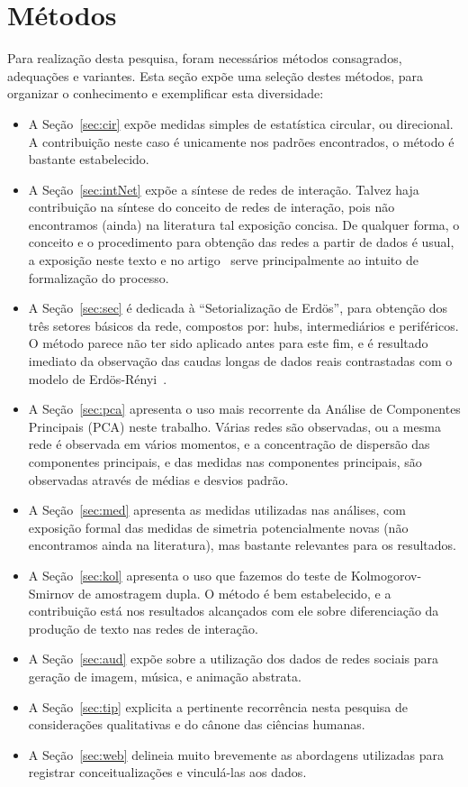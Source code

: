 \documentclass[a4paper,openright,12pt]{report} %
\begin{document}
\chapter{Métodos}\label{sec:met}
Para realização desta pesquisa, foram
necessários métodos consagrados, adequações
e variantes.
Esta seção expõe uma seleção destes métodos,
para organizar o conhecimento
e exemplificar esta diversidade:
\begin{itemize}
    \item A Seção~\ref{sec:cir} expõe medidas simples
de estatística circular, ou direcional.
A contribuição neste caso é unicamente nos
padrões encontrados, o método é bastante estabelecido.
    \item A Seção~\ref{sec:intNet} expõe a síntese de redes
        de interação. Talvez haja contribuição na síntese
        do conceito de redes de interação, pois não 
        encontramos (ainda) na literatura tal exposição
        concisa. De qualquer forma, o conceito e o procedimento
        para obtenção das redes a partir de dados é usual,
        a exposição neste texto e no artigo~\cite{timeS} serve
        principalmente ao intuito de formalização do
        processo.
    \item A Seção~\ref{sec:sec} é dedicada à ``Setorialização de Erdös'', para obtenção dos três setores básicos da rede, compostos por: hubs, intermediários e periféricos. 
        O método parece não ter sido aplicado antes para este fim, e é resultado imediato da observação das caudas longas de dados reais contrastadas com o modelo de Erdös-Rényi~\cite{3setores}.
    \item A Seção~\ref{sec:pca} apresenta o uso mais recorrente da Análise de Componentes Principais (PCA) neste trabalho. Várias redes são observadas, ou a mesma rede é observada em vários momentos, e a concentração
        de dispersão das componentes principais, e das medidas nas componentes principais, são observadas através de médias e desvios padrão.
    \item A Seção~\ref{sec:med} apresenta as medidas utilizadas nas análises, com exposição formal das medidas de simetria potencialmente novas (não encontramos ainda na literatura), mas bastante relevantes para os resultados.
    \item A Seção~\ref{sec:kol} apresenta o uso que fazemos do teste de Kolmogorov-Smirnov de amostragem dupla. O método é bem estabelecido, e a contribuição está nos resultados alcançados com ele sobre diferenciação 
        da produção de texto nas redes de interação.
    \item A Seção~\ref{sec:aud} expõe sobre a utilização dos dados de redes sociais para geração de imagem, música, e animação abstrata.
    \item A Seção~\ref{sec:tip} explicita a pertinente recorrência nesta pesquisa de considerações qualitativas e do cânone das ciências humanas.
    \item A Seção~\ref{sec:web} delineia muito brevemente as abordagens
        utilizadas para registrar conceitualizações e vinculá-las
        aos dados.
\end{itemize}
\end{document}
